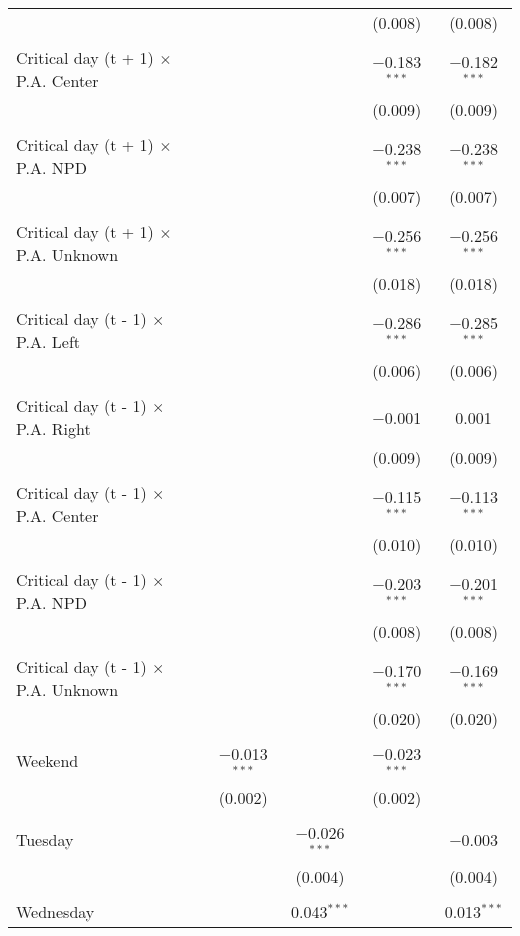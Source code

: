 \documentclass[
]{article}
\begin{document}
\begin{table}[!htbp]
{\begin{tabular}{@{\extracolsep{5pt}}lcccc}
  &  &  & (0.008) & (0.008) \\ 
  & & & & \\ 
 Critical day (t + 1) $\times$ P.A. Center &  &  & $-$0.183$^{***}$ & $-$0.182$^{***}$ \\ 
  &  &  & (0.009) & (0.009) \\ 
  & & & & \\ 
 Critical day (t + 1) $\times$ P.A. NPD &  &  & $-$0.238$^{***}$ & $-$0.238$^{***}$ \\ 
  &  &  & (0.007) & (0.007) \\ 
  & & & & \\ 
 Critical day (t + 1) $\times$ P.A. Unknown &  &  & $-$0.256$^{***}$ & $-$0.256$^{***}$ \\ 
  &  &  & (0.018) & (0.018) \\ 
  & & & & \\ 
 Critical day (t - 1) $\times$ P.A. Left &  &  & $-$0.286$^{***}$ & $-$0.285$^{***}$ \\ 
  &  &  & (0.006) & (0.006) \\ 
  & & & & \\ 
 Critical day (t - 1) $\times$ P.A. Right &  &  & $-$0.001 & 0.001 \\ 
  &  &  & (0.009) & (0.009) \\ 
  & & & & \\ 
 Critical day (t - 1) $\times$ P.A. Center &  &  & $-$0.115$^{***}$ & $-$0.113$^{***}$ \\ 
  &  &  & (0.010) & (0.010) \\ 
  & & & & \\ 
 Critical day (t - 1) $\times$ P.A. NPD &  &  & $-$0.203$^{***}$ & $-$0.201$^{***}$ \\ 
  &  &  & (0.008) & (0.008) \\ 
  & & & & \\ 
 Critical day (t - 1) $\times$ P.A. Unknown &  &  & $-$0.170$^{***}$ & $-$0.169$^{***}$ \\ 
  &  &  & (0.020) & (0.020) \\ 
  & & & & \\ 
 Weekend & $-$0.013$^{***}$ &  & $-$0.023$^{***}$ &  \\ 
  & (0.002) &  & (0.002) &  \\ 
  & & & & \\ 
 Tuesday &  & $-$0.026$^{***}$ &  & $-$0.003 \\ 
  &  & (0.004) &  & (0.004) \\ 
  & & & & \\ 
 Wednesday &  & 0.043$^{***}$ &  & 0.013$^{***}$ \\ 

\end{tabular}}
\end{table}
\end{document}
